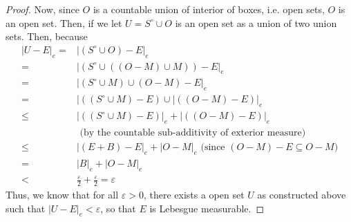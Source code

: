 \begin{answer}
\begin{proof}
        Now, since $O$ is a countable union of interior of boxes, i.e. open sets, $O$ is an open set. Then, if we let $U = S^{\circ} \cup O$ is an open set as a union of two union sets. Then, because
        \begin{equation}
            \begin{aligned}
                \lvert U - E \rvert_e = & \lvert (S^{\circ}\cup O) - E \rvert_e\\
                = &\lvert (S^{\circ}\cup ((O-M)\cup M)) - E \rvert_e\\
                = &\lvert (S^{\circ} \cup M) \cup (O - M) - E \rvert_e\\
                = &\lvert ((S^{\circ} \cup M) - E ) \cup \lvert((O-M)-E) \rvert_e\\
                \leq &\rvert ((S^{\circ} \cup M) - E) \rvert_e + \lvert ((O - M) - E) \rvert_e\\
                &\text{ (by the countable sub-additivity of exterior measure)}\\
                \leq &\lvert (E + B) - E \rvert_e + \lvert O - M \rvert_e \text{ (since $(O-M)-E \subseteq O-M$)}\\
                = &\lvert B \rvert_e + \lvert O - M \rvert_e\\
                < &\tfrac{\varepsilon}{2} + \tfrac{\varepsilon}{2} = \varepsilon
            \end{aligned}
        \end{equation}
        Thus, we know that for all $\varepsilon > 0$, there exists a open set $U$ as constructed above such that $\lvert U - E \rvert_e < \varepsilon$, so that $E$ is Lebesgue measurable.
    \end{proof}
\end{answer}